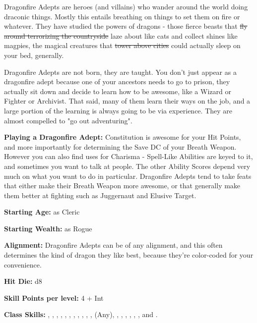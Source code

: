
Dragonfire Adepts are heroes (and villains) who wander around the world doing draconic things. Mostly this entails breathing on things to set them on fire or whatever. They have studied the powers of dragons - those fierce beasts that \sout{fly around terrorizing the countryside} laze about like cats and collect shines like magpies, the magical creatures that \sout{tower above cities} could actually sleep on your bed, generally.

Dragonfire Adepts are not born, they are taught. You don't just appear as a dragonfire adept because one of your ancestors needs to go to prison, they actually sit down and decide to learn how to be awesome, like a Wizard or Fighter or Archivist. That said, many of them learn their ways on the job, and a large portion of the learning is always going to be via experience. They are almost compelled to "go out adventuring".

\textbf{Playing a Dragonfire Adept:} Constitution is awesome for your Hit Points, and more importantly for determining the Save DC of your Breath Weapon. However you can also find uses for Charisma - Spell-Like Abilities are keyed to it, and sometimes you want to talk at people. The other Ability Scores depend very much on what you want to do in particular. Dragonfire Adepts tend to take feats that either make their Breath Weapon more awesome, or that generally make them better at fighting such as Juggernaut and Elusive Target.

\textbf{Starting Age:} as Cleric

\textbf{Starting Wealth:} as Rogue

\textbf{Alignment:} Dragonfire Adepts can be of any alignment, and this often determines the kind of dragon they like best, because they're color-coded for your convenience.

\textbf{Hit Die:} d8

\textbf{Skill Points per level:} 4 + Int

\textbf{Class Skills:} , , , , , , , , , , ,  (Any), , , , , , , and .

